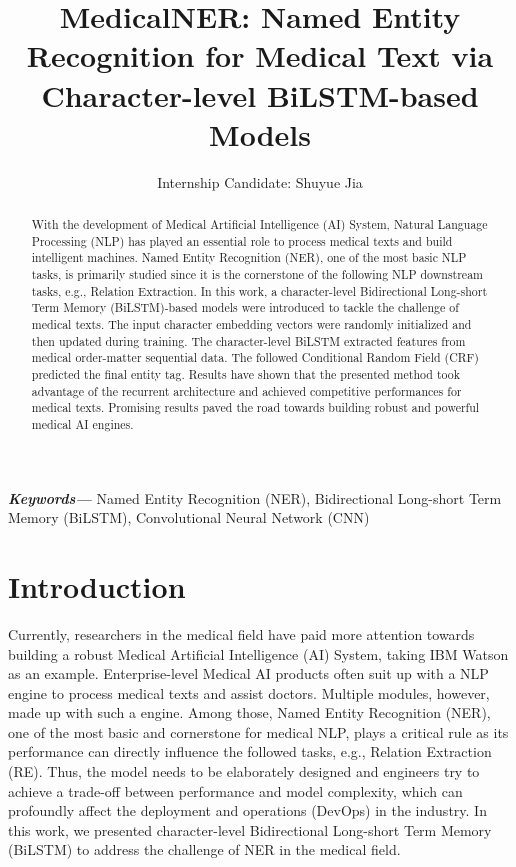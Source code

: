 \documentclass{article}
\title{MedicalNER: Named Entity Recognition for Medical Text via Character-level BiLSTM-based Models}
\author{Internship Candidate: Shuyue Jia}
\providecommand{\keywords}[1]
{
	\small	
	\textbf{\textit{Keywords---}} #1
}
\begin{document}
\maketitle

\begin{abstract}
With the development of Medical Artificial Intelligence (AI) System, Natural Language Processing (NLP) has played an essential role to process medical texts and build intelligent machines. Named Entity Recognition (NER), one of the most basic NLP tasks, is primarily studied since it is the cornerstone of the following NLP downstream tasks, e.g., Relation Extraction. In this work, a character-level Bidirectional Long-short Term Memory (BiLSTM)-based models were introduced to tackle the challenge of medical texts. The input character embedding vectors were randomly initialized and then updated during training. The character-level BiLSTM extracted features from medical order-matter sequential data. The followed Conditional Random Field (CRF) predicted the final entity tag. Results have shown that the presented method took advantage of the recurrent architecture and achieved competitive performances for medical texts. Promising results paved the road towards building robust and powerful medical AI engines.
\end{abstract}

\keywords{Named Entity Recognition (NER), Bidirectional Long-short Term Memory (BiLSTM), Convolutional Neural Network (CNN)}

\section{Introduction}
Currently, researchers in the medical field have paid more attention towards building a robust Medical Artificial Intelligence (AI) System, taking IBM Watson as an example. Enterprise-level Medical AI products often suit up with a NLP engine to process medical texts and assist doctors. Multiple modules, however, made up with such a engine. Among those, Named Entity Recognition (NER), one of the most basic and cornerstone for medical NLP, plays a critical rule as its performance can directly influence the followed tasks, e.g., Relation Extraction (RE). Thus, the model needs to be elaborately designed and engineers try to achieve a trade-off between performance and model complexity, which can profoundly affect the deployment and operations (DevOps) in the industry. In this work, we presented character-level Bidirectional Long-short Term Memory (BiLSTM) to address the challenge of NER in the medical field.
\end{document}
